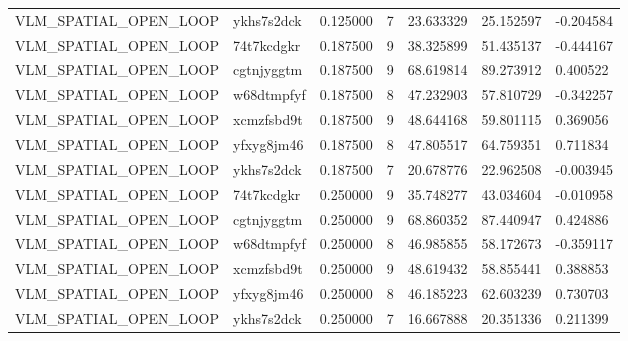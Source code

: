 \begin{tabular}{lllllll}
VLM\_SPATIAL\_OPEN\_LOOP & ykhs7s2dck & 0.125000 & 7 & 23.633329 & 25.152597 & -0.204584 \\
VLM\_SPATIAL\_OPEN\_LOOP & 74t7kcdgkr & 0.187500 & 9 & 38.325899 & 51.435137 & -0.444167 \\
VLM\_SPATIAL\_OPEN\_LOOP & cgtnjyggtm & 0.187500 & 9 & 68.619814 & 89.273912 & 0.400522 \\
VLM\_SPATIAL\_OPEN\_LOOP & w68dtmpfyf & 0.187500 & 8 & 47.232903 & 57.810729 & -0.342257 \\
VLM\_SPATIAL\_OPEN\_LOOP & xcmzfsbd9t & 0.187500 & 9 & 48.644168 & 59.801115 & 0.369056 \\
VLM\_SPATIAL\_OPEN\_LOOP & yfxyg8jm46 & 0.187500 & 8 & 47.805517 & 64.759351 & 0.711834 \\
VLM\_SPATIAL\_OPEN\_LOOP & ykhs7s2dck & 0.187500 & 7 & 20.678776 & 22.962508 & -0.003945 \\
VLM\_SPATIAL\_OPEN\_LOOP & 74t7kcdgkr & 0.250000 & 9 & 35.748277 & 43.034604 & -0.010958 \\
VLM\_SPATIAL\_OPEN\_LOOP & cgtnjyggtm & 0.250000 & 9 & 68.860352 & 87.440947 & 0.424886 \\
VLM\_SPATIAL\_OPEN\_LOOP & w68dtmpfyf & 0.250000 & 8 & 46.985855 & 58.172673 & -0.359117 \\
VLM\_SPATIAL\_OPEN\_LOOP & xcmzfsbd9t & 0.250000 & 9 & 48.619432 & 58.855441 & 0.388853 \\
VLM\_SPATIAL\_OPEN\_LOOP & yfxyg8jm46 & 0.250000 & 8 & 46.185223 & 62.603239 & 0.730703 \\
VLM\_SPATIAL\_OPEN\_LOOP & ykhs7s2dck & 0.250000 & 7 & 16.667888 & 20.351336 & 0.211399 \\
\hline
\end{tabular}
